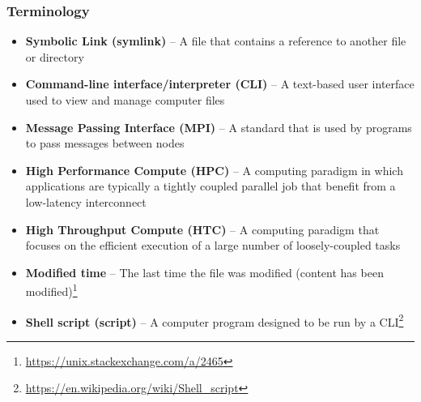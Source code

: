 \begin{frame}
	\frametitle{Terminology}
	\begin{itemize}
	\item \textbf{Symbolic Link (symlink)} -- A file that contains a reference to another file or directory
	\item \textbf{Command-line interface/interpreter (CLI)} -- A text-based user interface used to view and manage computer files 
	\item \textbf{Message Passing Interface (MPI)} -- A standard that is used by programs to pass messages between nodes
	\item \textbf{High Performance Compute (HPC)} -- A computing paradigm in which applications are typically a tightly coupled parallel job that benefit from a low-latency interconnect
	\item \textbf{High Throughput Compute (HTC)} -- A computing paradigm that focuses on the efficient execution of a large number of loosely-coupled tasks
        \item \textbf{Modified time} -- The last time the file was modified (content has been modified)\footnote{\label{Types of timestamps}\tiny\url{https://unix.stackexchange.com/a/2465}}
        \item \textbf{Shell script (script)} -- A computer program designed to be run by a CLI\footnote{\label{Shell script}\tiny\url{https://en.wikipedia.org/wiki/Shell_script}}
	\end{itemize}


\end{frame}
